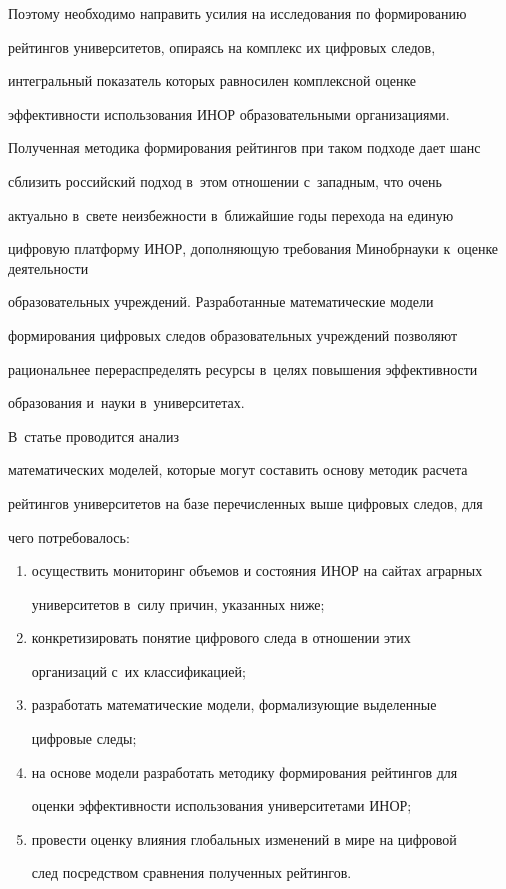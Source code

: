 

  Поэтому необходимо направить усилия на исследования по формированию 


рейтингов университетов, опираясь на комплекс их цифровых следов, 


интегральный показатель которых равносилен комплексной оценке 


эффективности использования ИНОР образовательными организациями. 


Полученная методика формирования рейтингов при таком подходе дает шанс 


сблизить российский подход в~этом отношении с~западным, что очень 


актуально в~свете неизбежности в~ближайшие годы перехода на единую 


цифровую платформу ИНОР, дополняющую требования Минобрнауки к~оценке деятельности 


образовательных учреж\-де\-ний. Разработанные математические модели 


формирования циф\-ро\-вых следов образовательных учреждений поз\-во\-ля\-ют 


рациональнее перераспределять ресурсы в~целях повышения эф\-фек\-тив\-ности 


образования и~науки в~университетах. 





В~статье проводится анализ 


математических моделей, которые могут со\-ста\-вить основу методик расчета 


рейтингов университетов на базе перечисленных выше циф\-ро\-вых следов, для 


чего потребовалось: 


  \begin{enumerate}[(1)]


\item осуществить мониторинг объемов и состояния ИНОР на сайтах аграрных 


университетов в~силу причин, указанных ниже;


\item  конкретизировать понятие цифрового следа в отношении этих 


организаций с~их классификацией;


\item  разработать математические модели, формализующие выделенные 


цифровые следы;


\item  на основе модели разработать методику формирования рейтингов для 


оценки эффективности использования университетами ИНОР;


\item  провести оценку влияния глобальных изменений в мире на цифровой 


след посредством сравнения полученных рейтингов.


  \end{enumerate}


